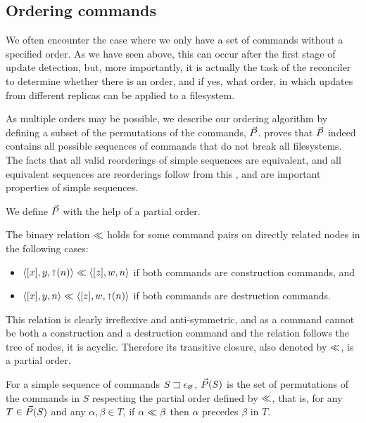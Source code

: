 
\subsection{Ordering commands}

We often encounter the case where we only have a set of commands without a specified order.
As we have seen above, this can occur after the first stage of update detection,
but, more importantly,
it is actually the task of the reconciler to determine whether there is an order,
and if yes, what order,
in which updates from different replicas can be applied to a filesystem.

As multiple orders may be possible,
we describe our ordering algorithm by
defining a subset of the permutations of the commands, $\ordersetsign$.
 proves that $\ordersetsign$ indeed contains all possible
sequences of commands that do not break all filesystems.
The facts that all valid reorderings of simple sequences are equivalent,
and all equivalent sequences are reorderings follow from this , and are important 
properties of simple sequences.

We define $\ordersetsign$ with the help of a partial order.
\begin{mydef}[$\orderrel$]
The binary relation $\orderrel$ holds for some command pairs
on directly related nodes in the following cases:
\begin{itemize}
\item $\langle{[x],y,\mathord{\shortuparrow}({n})}\rangle \ll \langle{[z],w,n}\rangle$ if both commands are construction commands, and
\item $\langle{[x],y,n}\rangle \ll \langle{[z],w,\mathord{\shortuparrow}({n})}\rangle$ if both commands are destruction commands. \qedhere
\end{itemize}
\end{mydef}
This relation is clearly irreflexive and anti-symmetric,
and as a command cannot be both a construction and a destruction command and
the relation follows the tree of nodes, it is acyclic.
Therefore its transitive closure, also denoted by $\orderrel$, is a partial order.

\begin{mydef}[$\ordersetsign$]
For a simple sequence of commands ${S}\sqsupset\epsilon_\varnothing$,
$\vec{P}({S})$ is the set of permutations of the commands in $S$ respecting the partial order defined by $\orderrel$,
that is,
for any $T\in\vec{P}({S})$ and any $\alpha,\beta\in T$, if $\alpha\ll\beta$ then $\alpha$
precedes $\beta$ in $T$.
\end{mydef}

